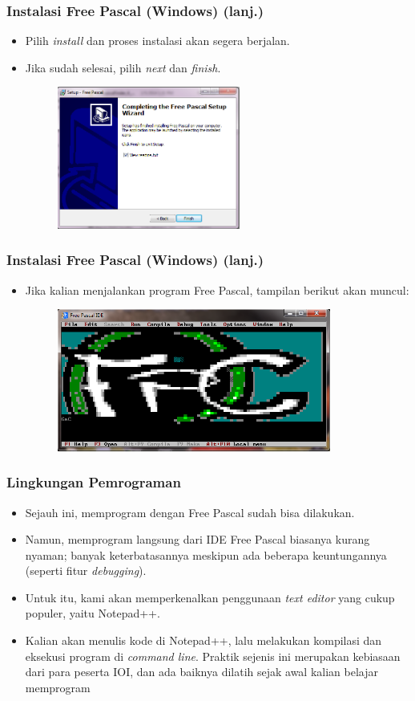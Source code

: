 \documentclass{beamer}
\begin{document}
\begin{frame}
\frametitle{Instalasi Free Pascal (Windows) (lanj.)}
\begin{itemize}
	\item Pilih \textit{install} dan proses instalasi akan segera berjalan.
	\item Jika sudah selesai, pilih \textit{next} dan \textit{finish}.
	\begin{figure}
		\includegraphics[width=6cm]{asset/fpc_10.PNG}
	\end{figure}
\end{itemize}
\end{frame}

\begin{frame}
\frametitle{Instalasi Free Pascal (Windows) (lanj.)}
\begin{itemize}
	\item Jika kalian menjalankan program Free Pascal, tampilan berikut akan muncul:
	\begin{figure}
		\includegraphics[width=9cm]{asset/fpc_11.PNG}
	\end{figure}
\end{itemize}
\end{frame}

\begin{frame}
\frametitle{Lingkungan Pemrograman}
\begin{itemize}
	\item Sejauh ini, memprogram dengan Free Pascal sudah bisa dilakukan. 
	\item Namun, memprogram langsung dari IDE Free Pascal biasanya kurang nyaman; banyak keterbatasannya meskipun ada beberapa keuntungannya (seperti fitur \textit{debugging}).
	\item Untuk itu, kami akan memperkenalkan penggunaan \textit{text editor} yang cukup populer, yaitu Notepad++.
	\item Kalian akan menulis kode di Notepad++, lalu melakukan kompilasi dan eksekusi program di \textit{command line}. Praktik sejenis ini merupakan kebiasaan dari para peserta IOI, dan ada baiknya dilatih sejak awal kalian belajar memprogram \text{:)}
\end{itemize}
\end{frame}
\end{document}
